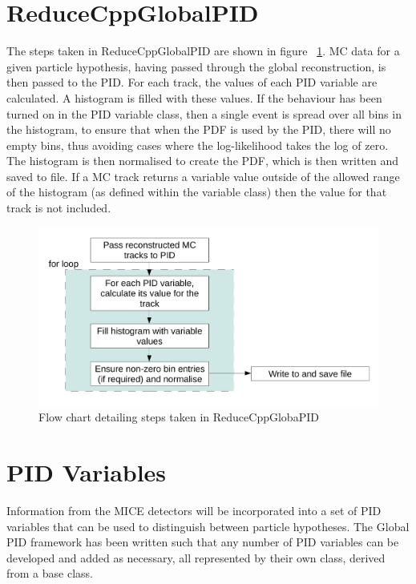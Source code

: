 \documentclass[a4paper,12pt]{article}
\begin{document}
\section{ReduceCppGlobalPID}
\label{reducer}
The steps taken in ReduceCppGlobalPID are shown in figure ~\ref{reduceflow}. MC data for a given particle hypothesis, having passed through the global reconstruction, is then passed to the PID. For each track, the values of each PID variable are calculated. A histogram is filled with these values. If the behaviour has been turned on in the PID variable class, then a single event is spread over all bins in the histogram, to ensure that when the PDF is used by the PID, there will no empty bins, thus avoiding cases where the log-likelihood takes the log of zero. The histogram is then normalised to create the PDF, which is then written and saved to file.
If a MC track returns a variable value outside of the allowed range of the histogram (as defined within the variable class) then the value for that track is not included.
\begin{figure}[h!]
\begin{center} 
\includegraphics[width=5in]{PDFflow.pdf} 
\caption{Flow chart detailing steps taken in ReduceCppGlobaPID}
\label{reduceflow}
\end{center} 
\end{figure}

\section{PID Variables}
\label{PID}
Information from the MICE detectors will be incorporated into a set of 
PID variables that can be used to distinguish between particle 
hypotheses.
The Global PID framework has been written such that any number of PID 
variables can be developed and added as necessary, all represented by 
their own class, derived from a base class.
\end{document}
